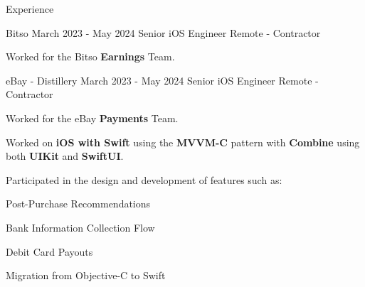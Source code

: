 \documentclass{curriculum}
\begin{document}
\begin{cvsection}{Experience}


    \makesectionitemheader
        {Bitso}                     {March 2023 - May 2024}
        {Senior iOS Engineer}       {Remote - Contractor}

        \begin{sectionitemlist}

        \item{
            Worked for the Bitso \textbf{Earnings} Team.
        }

        \end{sectionitemlist}


    \makesectionitemheader
        {eBay - Distillery}         {March 2023 - May 2024}
        {Senior iOS Engineer}       {Remote - Contractor}

        \begin{sectionitemlist}

        \item{
            Worked for the eBay \textbf{Payments} Team.
        }

        \item{
            Worked on \textbf{iOS with Swift} using the \textbf{MVVM-C} pattern
            with \textbf{Combine} using both \textbf{UIKit} and \textbf{SwiftUI}.
        }

        \item{
            Participated in the design and development of features such as:
        } {
            \begin{colsectionitemlist}{2}
            \item{Post-Purchase Recommendations}
            \item{Bank Information Collection Flow}
            \item{Debit Card Payouts}
            \item{Migration from Objective-C to Swift}
            \end{colsectionitemlist}
        }


\end{sectionitemlist}
\end{cvsection}
\end{document}
